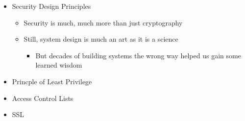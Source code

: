 \documentclass[12pt]{article}
\begin{document}
\begin{itemize}
    \item Security Design Principles
    \begin{itemize}
        \item Security is much, much more than just cryptography
        \item Still, system design is much an art as it is a science
        \begin{itemize}
            \item But decades of building systems the wrong way helped us
            gain some learned wisdom
        \end{itemize}
    \end{itemize}

    \item Princple of Least Privilege
    \item Access Control Lists
    \item SSL
\end{itemize}
\end{document}
